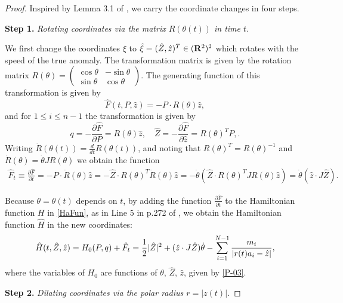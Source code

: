 \documentclass[11pt]{article}
\def\be{\begin{equation}}
\def\ee{\end{equation}}
\def\lb{\label}
\def\pt{\partial}
\def\R{{\bf R}}
\def\th{{\theta}}
\begin{document}
\begin{proof}%
  Inspired by Lemma 3.1 of \cite{MS}, we carry the coordinate
  changes in four steps.
  
  {\bf Step 1.} {\it Rotating coordinates via the matrix $R(\th(t))$ in time $t$.}
  
  We first change the coordinates $\xi$ to $\hat{\xi}=(\hat{Z}, \hat{z})^T \in (\R^2)^2$
  which rotates with the speed of the true anomaly. The transformation matrix is given by the rotation
  matrix $R(\th) = (
  \begin{smallmatrix}
         \cos\th &-\sin\th \\\sin \th & \cos\th
  \end{smallmatrix})$. The generating function of this
  transformation is given by
  \be  \hat{F}(t, P, \hat{z})
         = -P\cdot R(\th)\hat{z},  \lb{P-02}\ee
  and for $1\le i\le n-1$ the transformation is given by
  \be
  q = -\frac{\pt \hat{F}}{\pt P} = R(\th)\hat{z},  \quad 
  \hat{Z} = -\frac{\pt \hat{F}}{\pt \hat{z}} = R(\th)^TP,  \lb{P-03}. \ee
  Writing $\dot{R}(\th(t))=\frac{d}{dt}R(\th(t))$, and noting that $R(\th)^T=R(\th)^{-1}$ and
  $\dot{R}(\th)=\dot{\th}JR(\th)$ we obtain the function
  \begin{align}
    \hat{F}_t
  \equiv \frac{\pt \hat{F}}{\pt t} = -P\cdot\dot{R}(\th)\hat{z} 
  = -\hat{Z}\cdot R(\th)^T\dot{R}(\th)\hat{z} 
  = -\dot{\th}\left(\hat{Z}\cdot R(\th)^TJR(\th)\hat{z}\right) 
  = \dot{\th}(\hat{z}\cdot J\hat{Z}).
  \end{align}
  
  Because $\th=\th(t)$ depends on $t$, by adding the function
  $\frac{\pt \hat{F}}{\pt t}$ to the Hamiltonian function $H$ in \eqref{HaFun}, as in Line 5 in p.272 of \cite{MS}, we obtain the Hamiltonian function $\hat{H}$ in the
  new coordinates:
  \be
  \hat{H}(t,\hat{Z},\hat{z}) = H_0(P,q) + \hat{F}_t  
  = \frac{1}{2}|\hat{Z}|^2 + (\hat{z}\cdot J\hat{Z})\dot{\th}
               - \sum_{i=1}^{N-1}{m_i\over|r(t)a_i-\hat{z}|},   \lb{P-07}
  \ee
  where the variables of $H_0$ are functions of $\th$, $\hat{Z}$, $\hat{z}$,  given by \eqref{P-03}.
  
  
  {\bf Step 2.} {\it Dilating coordinates via the polar radius $r=|z(t)|$.}
  

\end{proof}
\end{document}
